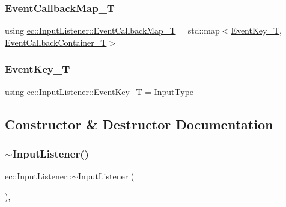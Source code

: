 \mbox{\label{classec_1_1_input_listener_a13553604a5ae8c32fa95d304206aa01a}} 
\subsubsection{\texorpdfstring{Event\+Callback\+Map\+\_\+T}{EventCallbackMap\_T}}
{\footnotesize\ttfamily using \mbox{\hyperlink{classec_1_1_input_listener_a13553604a5ae8c32fa95d304206aa01a}{ec\+::\+Input\+Listener\+::\+Event\+Callback\+Map\+\_\+T}} =  std\+::map$<$\mbox{\hyperlink{namespaceec_a5de6bdb8c4b2ed6e590e721ec998f964}{Event\+Key\+\_\+T}}, \mbox{\hyperlink{classec_1_1_input_listener_a3bb7086fdca1d1a76428b1e737e9e002}{Event\+Callback\+Container\+\_\+T}}$>$}

\mbox{\label{classec_1_1_input_listener_a741cc6a2d59a823b5bfbc4e48e1a147f}} 
\subsubsection{\texorpdfstring{Event\+Key\+\_\+T}{EventKey\_T}}
{\footnotesize\ttfamily using \mbox{\hyperlink{namespaceec_a5de6bdb8c4b2ed6e590e721ec998f964}{ec\+::\+Input\+Listener\+::\+Event\+Key\+\_\+T}} =  \mbox{\hyperlink{namespaceec_a5de6bdb8c4b2ed6e590e721ec998f964}{Input\+Type}}}



\subsection{Constructor \& Destructor Documentation}
\mbox{\label{classec_1_1_input_listener_afd65ca201e735f5758646d6653f42804}} 
\subsubsection{\texorpdfstring{$\sim$\+Input\+Listener()}{~InputListener()}}
{\footnotesize\ttfamily ec\+::\+Input\+Listener\+::$\sim$\+Input\+Listener (\begin{DoxyParamCaption}{ }\end{DoxyParamCaption})\hspace{0.3cm}{\ttfamily [virtual]}, {\ttfamily [default]}}

